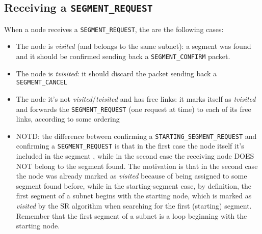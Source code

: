 \subsection{Receiving a \texttt{SEGMENT\_REQUEST}}
When a node receives a \texttt{SEGMENT\_REQUEST}, the are the following cases:

\begin{itemize}
\item The node is \emph{visited} (and belongs to the same subnet): a segment was
found and it should be confirmed sending back a \texttt{SEGMENT\_CONFIRM}
packet.  
\item The node is \emph{tvisited}: it should discard the packet sending
back a \texttt{SEGMENT\_CANCEL} 
\item The node it's not \emph{visited}/\emph{tvisited} and has free
links: it marks itself as \emph{tvisited} and forwards the \texttt{SEGMENT\_REQUEST}
(one request at time) to each of its free links, according to some
ordering
\item NOTD: the difference between confirming a \texttt{STARTING\_SEGMENT\_REQUEST}
and confirming a \texttt{SEGMENT\_REQUEST} is that in the first case the node
itself it's included in the segment , while in the second case the
receiving node DOES NOT belong to the segment found. The motivation is
that in the second case the node was already marked as \emph{visited} because
of being assigned to some segment found before, while in the
starting-segment case, by definition, the first segment of a subnet
begins with the starting node, which is marked as \emph{visited} by the SR
algorithm when searching for the first (starting) segment. Remember
that the first segment of a subnet is a loop beginning with the
starting node. 
\end{itemize}

